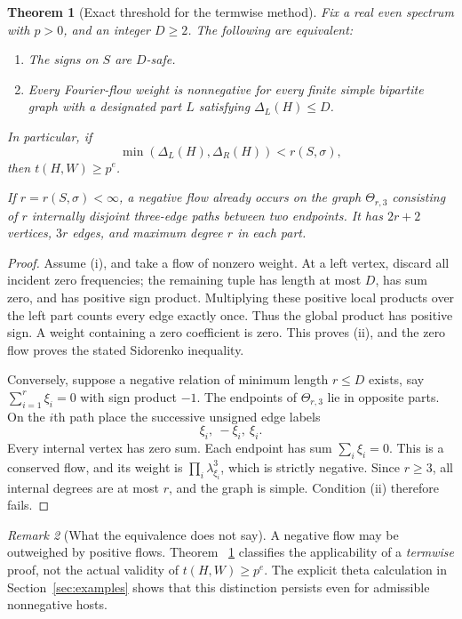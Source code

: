 \documentclass[11pt]{article}
\numberwithin{equation}{section}
\newtheorem{theorem}{Theorem}[section]
\theoremstyle{definition}
\theoremstyle{remark}
\newtheorem{remark}[theorem]{Remark}
\begin{document}
\begin{theorem}[Exact threshold for the termwise method]
\label{thm:threshold}
Fix a real even spectrum with $p>0$, and an integer $D\geq2$. The
following are equivalent:
\begin{enumerate}[label=(\roman*)]
 \item The signs on $S$ are $D$-safe.
 \item Every Fourier-flow weight is nonnegative for every finite simple
 bipartite graph with a designated part $L$ satisfying $\Delta_L(H)\leq D$.
\end{enumerate}
In particular, if
\begin{equation}
 \min(\Delta_L(H),\Delta_R(H))<r(S,\sigma),
 \label{eq:degree-threshold}
\end{equation}
then $t(H,W)\geq p^e$.

If $r=r(S,\sigma)<\infty$, a negative flow already occurs on the graph
$\Theta_{r,3}$ consisting of $r$ internally disjoint three-edge paths
between two endpoints. It has $2r+2$ vertices, $3r$ edges, and maximum
degree $r$ in each part.
\end{theorem}
\begin{proof}
Assume (i), and take a flow of nonzero weight. At a left vertex, discard
all incident zero frequencies; the remaining tuple has length at most
$D$, has sum zero, and has positive sign product. Multiplying these
positive local products over the left part counts every edge exactly
once. Thus the global product has positive sign. A weight containing a
zero coefficient is zero. This proves (ii), and the zero flow proves the
stated Sidorenko inequality.

Conversely, suppose a negative relation of minimum length $r\leq D$
exists, say $\sum_{i=1}^r\xi_i=0$ with sign product $-1$. The endpoints
of $\Theta_{r,3}$ lie in opposite parts. On the $i$th path place the
successive unsigned edge labels
\[
   \xi_i,\ -\xi_i,\ \xi_i.
\]
Every internal vertex has zero sum. Each endpoint has sum
$\sum_i\xi_i=0$. This is a conserved flow, and its weight is
$\prod_i\lambda_{\xi_i}^3$, which is strictly negative. Since $r\geq3$,
all internal degrees are at most $r$, and the graph is simple. Condition
(ii) therefore fails.
\end{proof}

\begin{remark}[What the equivalence does not say]
\label{rem:not-sidorenko}
A negative flow may be outweighed by positive flows. Theorem~
\ref{thm:threshold} classifies the applicability of a \emph{termwise}
proof, not the actual validity of $t(H,W)\geq p^e$. The explicit theta
calculation in Section~\ref{sec:examples} shows that this distinction
persists even for admissible nonnegative hosts.
\end{remark}
\end{document}
